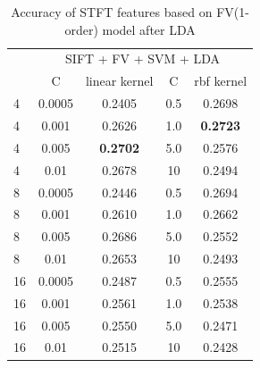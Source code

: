 \documentclass[conference]{IEEEtran}
\begin{document}
\begin{table}[htbp]
	\centering
	\newcommand{\tabincell}[2]{\begin{tabular}{@{}#1@{}}#2\end{tabular}}
	\renewcommand\arraystretch{1.0}
	\caption{Accuracy of STFT features based on FV(1-order) model after LDA}
	\label{base7}%
	\begin{tabular}{@{}p{1cm}<{\centering}|c|c|c|c}
		\hline
		\multirow{2}{*}{\diagbox[height=2\line,width=1.42cm,font=\tiny]{$k$}{Acc.}{$\mathit{M}$}} &
		\multicolumn{4}{c}{SIFT + FV + SVM + LDA}\\
		\cline{2-5}
		& {C} & {linear kernel} & {C} & {rbf kernel}\\
		\hline
		4   & 0.0005  & 0.2405 & 0.5 & 0.2698\\
		4   & 0.001  & 0.2626 & 1.0 & \textbf{0.2723}\\
		4   & 0.005  & \textbf{0.2702} & 5.0 & 0.2576\\
		4   & 0.01  & 0.2678 & 10 & 0.2494\\
		8   & 0.0005 & 0.2446 & 0.5 & 0.2694\\
		8   & 0.001 & 0.2610 & 1.0 & 0.2662\\
		8   & 0.005 & 0.2686 & 5.0 & 0.2552\\
		8   & 0.01  & 0.2653 & 10 & 0.2493\\
		16   & 0.0005  & 0.2487 & 0.5 & 0.2555\\
		16   & 0.001  & 0.2561 & 1.0 & 0.2538\\
		16   & 0.005  & 0.2550 & 5.0 & 0.2471\\
		16   & 0.01  & 0.2515 & 10 & 0.2428\\
		\hline
	\end{tabular}
\end{table}
\end{document}
